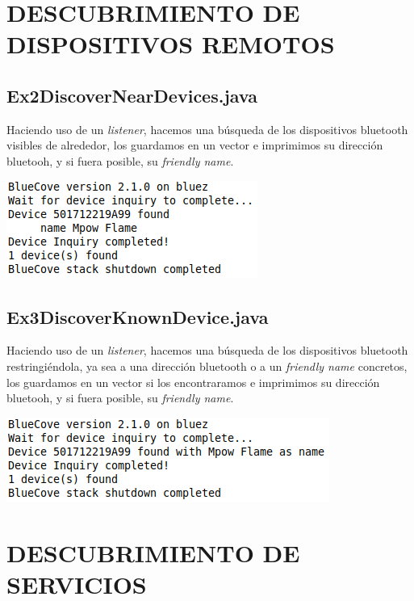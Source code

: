 \documentclass{article}
\begin{document}
\section{DESCUBRIMIENTO DE DISPOSITIVOS REMOTOS}

\subsection{Ex2DiscoverNearDevices.java}

Haciendo uso de un \textit{listener}, hacemos una búsqueda de los dispositivos bluetooth visibles de alrededor, los guardamos en un vector e imprimimos su dirección bluetooh, y si fuera posible, su \textit{friendly name}.

\begin{flushleft}
	\includegraphics[scale=0.6]{imagenes/Ex2DiscoverNearDevices.png} 
\end{flushleft}

\subsection{Ex3DiscoverKnownDevice.java}

Haciendo uso de un \textit{listener}, hacemos una búsqueda de los dispositivos bluetooth restringiéndola, ya sea a una dirección bluetooth o a un \textit{friendly name} concretos, los guardamos en un vector si los encontraramos e imprimimos su dirección bluetooh, y si fuera posible, su \textit{friendly name}.

\begin{flushleft}
	\includegraphics[scale=0.6]{imagenes/Ex3DiscoverKnownDevice.png} 
\end{flushleft}

\section{DESCUBRIMIENTO DE SERVICIOS}
\end{document}
